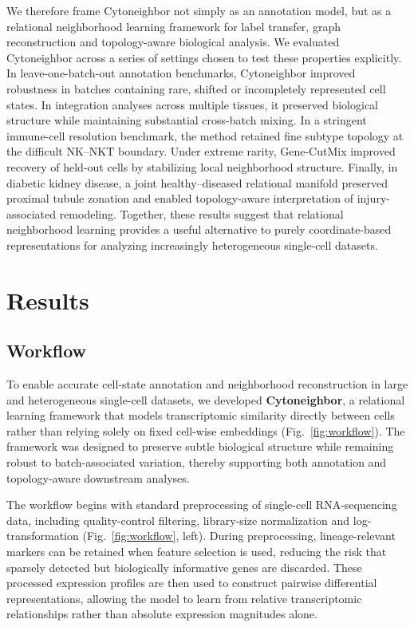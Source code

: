 \documentclass[11pt]{article}
\begin{document}
We therefore frame Cytoneighbor not simply as an annotation model, but as a relational neighborhood learning framework for label transfer, graph reconstruction and topology-aware biological analysis. We evaluated Cytoneighbor across a series of settings chosen to test these properties explicitly. In leave-one-batch-out annotation benchmarks, Cytoneighbor improved robustness in batches containing rare, shifted or incompletely represented cell states. In integration analyses across multiple tissues, it preserved biological structure while maintaining substantial cross-batch mixing. In a stringent immune-cell resolution benchmark, the method retained fine subtype topology at the difficult NK--NKT boundary. Under extreme rarity, Gene-CutMix improved recovery of held-out cells by stabilizing local neighborhood structure. Finally, in diabetic kidney disease, a joint healthy--diseased relational manifold preserved proximal tubule zonation and enabled topology-aware interpretation of injury-associated remodeling. Together, these results suggest that relational neighborhood learning provides a useful alternative to purely coordinate-based representations for analyzing increasingly heterogeneous single-cell datasets.


\section{Results}

\subsection{Workflow}

To enable accurate cell-state annotation and neighborhood reconstruction in large and heterogeneous single-cell datasets, we developed \textbf{Cytoneighbor}, a relational learning framework that models transcriptomic similarity directly between cells rather than relying solely on fixed cell-wise embeddings (Fig.~\ref{fig:workflow}). The framework was designed to preserve subtle biological structure while remaining robust to batch-associated variation, thereby supporting both annotation and topology-aware downstream analyses.

The workflow begins with standard preprocessing of single-cell RNA-sequencing data, including quality-control filtering, library-size normalization and log-transformation (Fig.~\ref{fig:workflow}, left). During preprocessing, lineage-relevant markers can be retained when feature selection is used, reducing the risk that sparsely detected but biologically informative genes are discarded. These processed expression profiles are then used to construct pairwise differential representations, allowing the model to learn from relative transcriptomic relationships rather than absolute expression magnitudes alone.
\end{document}
